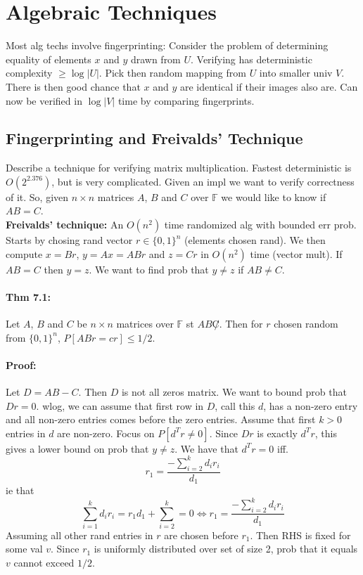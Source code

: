 \documentclass[a4paper]{article}
\begin{document}
\section{Algebraic Techniques}
\label{sec:Algebraic Techniques}
Most alg techs involve fingerprinting: Consider the problem of determining equality of elements $x$ and $y$ drawn from $U$. Verifying has deterministic complexity $ \geq \log|U|$. Pick then random mapping from $U$ into smaller univ $V$. There is then good chance that $x$ and $y$ are identical if their images also are. Can now be verified in $\log |V|$ time by comparing fingerprints.
\subsection{Fingerprinting and Freivalds' Technique}
\label{sub:Fingerprinting and Freivalds' Technique}
Describe a technique for verifying matrix multiplication. Fastest deterministic is $O(2^{2.376})$, but is very complicated. Given an impl we want to verify correctness of it. So, given $n\times n$ matrices $A$, $B$ and $C$ over $\mathbb{F}$ we would like to know if $AB=C$.\\

\textbf{Freivalds' technique:} An $O(n^2)$ time randomized alg with bounded err prob. Starts by chosing rand vector $r\in\{0,1\}^n$ (elements chosen rand). We then compute $x=Br$, $y=Ax=ABr$ and $z=Cr$ in $O(n^2)$ time (vector mult). If $AB=C$ then $y=z$. We want to find prob that $y\not = z$ if $AB\not = C$.
\paragraph{Thm 7.1:} Let $A$, $B$ and $C$ be $n\times n$ matrices over $ \mathbb{F}$ st $AB\not C$. Then for $r$ chosen random from $\{0,1\}^n$, $P[ABr=cr]\leq 1/2$.
\paragraph{Proof:} Let $D=AB-C$. Then $D$ is not all zeros matrix. We want to bound prob that $Dr=0$. wlog, we can assume that first row in $D$, call this $d$, has a non-zero entry and all non-zero entries comes before the zero entries. Assume that first $k>0$ entries in $d$ are non-zero. Focus on $P[d^T r\not = 0]$. Since $Dr$ is exactly $d^Tr$, this gives a lower bound on prob that $y\not = z$. We have that $d^Tr=0$ iff.
$$
  r_1=\frac{-\sum^{k}_{i=2}d_ir_i }{d_1}
$$
ie that
$$
  \sum^{k}_{i=1} d_ir_i=r_1d_1+\sum^{k}_{i=2} = 0\Leftrightarrow r_1=\frac{-\sum^{k}_{i=2}d_ir_i }{d_1}
$$
Assuming all other rand entries in $r$ are chosen before $r_1$. Then RHS is fixed for some val $v$. Since $r_1$ is uniformly distributed over set of size 2, prob that it equals $v$ cannot exceed $1/2$.\\
\end{document}
